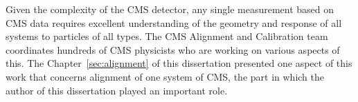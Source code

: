 
Given the complexity of the CMS detector, any single measurement based on CMS data requires excellent understanding of the geometry and response of all systems to particles of all types. The CMS Alignment and Calibration team coordinates hundreds of CMS physicists who are working on various aspects of this. The Chapter~\ref{sec:alignment} of this dissertation presented one aspect of this work that concerns alignment of one system of CMS, the part in which the author of this dissertation played an important role.
